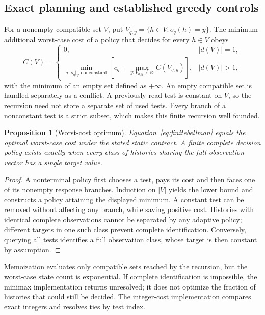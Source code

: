 \documentclass[11pt,a4paper]{article}
\newtheorem{proposition}[theorem]{Proposition}
\theoremstyle{definition}\newtheorem{definition}[theorem]{Definition}
\begin{document}
\subsection{Exact planning and established greedy controls}
For a nonempty compatible set $V$, put $V_{q,y}=\{h\in V:o_q(h)=y\}$. The minimum additional worst-case cost of a policy that decides for every $h\in V$ obeys
\begin{equation}
 C(V)=\begin{cases}
 0,& |d(V)|=1,\\
 \displaystyle\min_{q:\,o_q|_V\text{ nonconstant}}
 \left[c_q+\max_{y:V_{q,y}\ne\varnothing}C(V_{q,y})\right],& |d(V)|>1,
 \end{cases} \label{eq:finitebellman}
\end{equation}
with the minimum of an empty set defined as $+\infty$. An empty compatible set is handled separately as a conflict. A previously read test is constant on $V$, so the recursion need not store a separate set of used tests. Every branch of a nonconstant test is a strict subset, which makes this finite recursion well founded.

\begin{proposition}[Worst-cost optimum]
Equation~\eqref{eq:finitebellman} equals the optimal worst-case cost under the stated static contract. A finite complete decision policy exists exactly when every class of histories sharing the full observation vector has a single target value.
\end{proposition}
\begin{proof}
A nonterminal policy first chooses a test, pays its cost and then faces one of its nonempty response branches. Induction on $|V|$ yields the lower bound and constructs a policy attaining the displayed minimum. A constant test can be removed without affecting any branch, while saving positive cost. Histories with identical complete observations cannot be separated by any adaptive policy; different targets in one such class prevent complete identification. Conversely, querying all tests identifies a full observation class, whose target is then constant by assumption.
\end{proof}

Memoization evaluates only compatible sets reached by the recursion, but the worst-case state count is exponential. If complete identification is impossible, the minimax implementation returns unresolved; it does not optimize the fraction of histories that could still be decided. The integer-cost implementation compares exact integers and resolves ties by test index.
\end{document}
